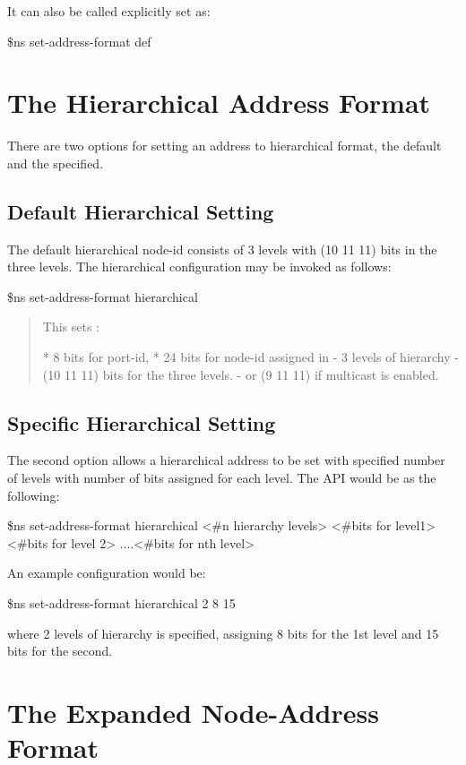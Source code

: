 It can also be called explicitly set as:
\begin{program}
\$ns set-address-format def
\end{program}


\section{The Hierarchical Address Format}
\label{sec:hierFormat}

There are two options for setting an address to hierarchical format, the
default and the specified.

\subsection{Default Hierarchical Setting}
\label{sec:def-hier}
The default hierarchical node-id consists of 3 levels with (10 11 11) bits
in the three levels. The hierarchical configuration may be invoked as
follows: 

\$ns set-address-format hierarchical

\begin{quote}
This sets :

* 8 bits for port-id, 
* 24 bits for node-id assigned in 
  - 3 levels of hierarchy 
  - (10 11 11) bits for the three levels. 
  - or (9 11 11) if multicast is enabled. 
\end{quote}

\subsection{Specific Hierarchical Setting}
\label{sec:sp-hier}
The second option allows a hierarchical address to be set with specified
number of levels with number of bits assigned for each level. The API
would be as the following:

\$ns set-address-format hierarchical <\#n hierarchy levels> <\#bits for
level1> <\#bits for level 2> ....<\#bits for nth level> 


An example configuration would be:

\$ns set-address-format hierarchical 2 8 15 

where 2 levels of hierarchy is specified, assigning 8 bits for the 1st
level and 15 bits for the second.


\section{The Expanded Node-Address Format}
\label{sec:expandFormat}


